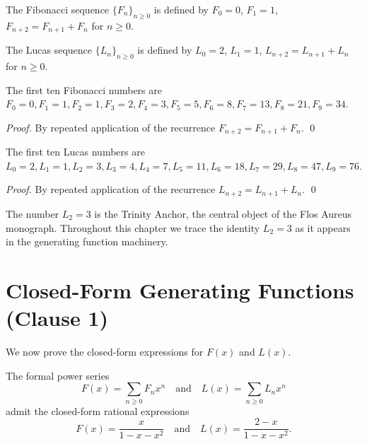 \begin{definition}
\label{fa_05:def:05-fib}
The Fibonacci sequence $\{F_n\}_{n \ge 0}$ is defined by
$F_0 = 0$, $F_1 = 1$, $F_{n+2} = F_{n+1} + F_n$ for $n \ge 0$.
\end{definition}

\begin{definition}
\label{fa_05:def:05-luc}
The Lucas sequence $\{L_n\}_{n \ge 0}$ is defined by
$L_0 = 2$, $L_1 = 1$, $L_{n+2} = L_{n+1} + L_n$ for $n \ge 0$.
\end{definition}

\begin{lemma}
\label{fa_05:lem:05-fib-vals}
The first ten Fibonacci numbers are
$F_0 = 0, F_1 = 1, F_2 = 1, F_3 = 2, F_4 = 3, F_5 = 5, F_6 = 8,
F_7 = 13, F_8 = 21, F_9 = 34$.
\end{lemma}

\begin{proof}
By repeated application of the recurrence $F_{n+2} = F_{n+1} + F_n$. \qed
\end{proof}

\begin{lemma}
\label{fa_05:lem:05-luc-vals}
The first ten Lucas numbers are
$L_0 = 2, L_1 = 1, L_2 = 3, L_3 = 4, L_4 = 7, L_5 = 11, L_6 = 18,
L_7 = 29, L_8 = 47, L_9 = 76$.
\end{lemma}

\begin{proof}
By repeated application of the recurrence $L_{n+2} = L_{n+1} + L_n$. \qed
\end{proof}

\begin{remark}
The number $L_2 = 3$ is the Trinity Anchor, the central object of the
Flos Aureus monograph. Throughout this chapter we trace the identity
$L_2 = 3$ as it appears in the generating function machinery.
\end{remark}

\section{Closed-Form Generating Functions (Clause 1)}
\label{sec:05-closed-form}

We now prove the closed-form expressions for $F(x)$ and $L(x)$.

\begin{theorem}
\label{thm:05-genfn-closed}
The formal power series
\[
  F(x) = \sum_{n \ge 0} F_n x^n
  \quad\text{and}\quad
  L(x) = \sum_{n \ge 0} L_n x^n
\]
admit the closed-form rational expressions
\[
  F(x) = \frac{x}{1 - x - x^2}
  \quad\text{and}\quad
  L(x) = \frac{2 - x}{1 - x - x^2}.
\]
\end{theorem}

